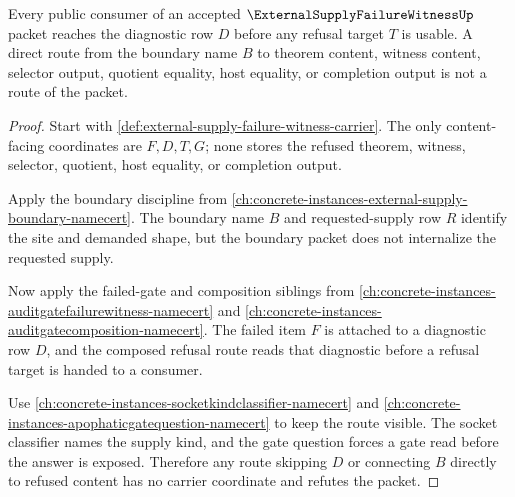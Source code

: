 \begin{theorem}
\label{thm:external-supply-failure-witness-diagnostic-nonescape}
Every public consumer of an accepted $\ExternalSupplyFailureWitnessUp$ packet reaches the diagnostic row $D$ before any refusal target $T$ is usable. A direct route from the boundary name $B$ to theorem content, witness content, selector output, quotient equality, host equality, or completion output is not a route of the packet.
\end{theorem}
\begin{proof}
Start with \autoref{def:external-supply-failure-witness-carrier}. The only content-facing coordinates are $F,D,T,G$; none stores the refused theorem, witness, selector, quotient, host equality, or completion output.

Apply the boundary discipline from \autoref{ch:concrete-instances-external-supply-boundary-namecert}. The boundary name $B$ and requested-supply row $R$ identify the site and demanded shape, but the boundary packet does not internalize the requested supply.

Now apply the failed-gate and composition siblings from \autoref{ch:concrete-instances-auditgatefailurewitness-namecert} and \autoref{ch:concrete-instances-auditgatecomposition-namecert}. The failed item $F$ is attached to a diagnostic row $D$, and the composed refusal route reads that diagnostic before a refusal target is handed to a consumer.

Use \autoref{ch:concrete-instances-socketkindclassifier-namecert} and \autoref{ch:concrete-instances-apophaticgatequestion-namecert} to keep the route visible. The socket classifier names the supply kind, and the gate question forces a gate read before the answer is exposed. Therefore any route skipping $D$ or connecting $B$ directly to refused content has no carrier coordinate and refutes the packet.
\end{proof}



